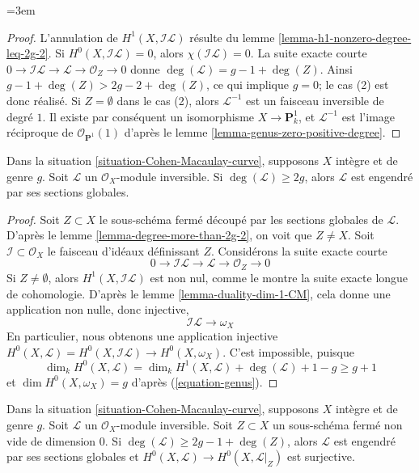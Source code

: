 \begingroup\emergencystretch=3em
\begin{proof}
L'annulation de $H^1(X, \mathcal{I}\mathcal{L})$ résulte du lemme \ref{lemma-h1-nonzero-degree-leq-2g-2}. Si $H^0(X, \mathcal{I}\mathcal{L}) = 0$, alors $\chi(\mathcal{I}\mathcal{L}) = 0$. La suite exacte courte $0 \to \mathcal{I}\mathcal{L} \to \mathcal{L} \to \mathcal{O}_Z \to 0$ donne $\deg(\mathcal{L}) = g - 1 + \deg(Z)$. Ainsi $g - 1 + \deg(Z) > 2g - 2 + \deg(Z)$, ce qui implique $g = 0$; le cas (2) est donc réalisé. Si $Z = \emptyset$ dans le cas (2), alors $\mathcal{L}^{-1}$ est un faisceau inversible de degré $1$. Il existe par conséquent un isomorphisme $X \to \mathbf{P}^1_k$, et $\mathcal{L}^{-1}$ est l'image réciproque de $\mathcal{O}_{\mathbf{P}^1}(1)$ d'après le lemme \ref{lemma-genus-zero-positive-degree}.
\end{proof}
\endgroup

\begin{lemma}
\label{lemma-degree-more-than-2g}
\begin{reference}
\cite[Lemme 3]{Jongmin}
\end{reference}
Dans la situation \ref{situation-Cohen-Macaulay-curve}, supposons $X$ intègre et de genre $g$. Soit $\mathcal{L}$ un $\mathcal{O}_X$-module inversible. Si $\deg(\mathcal{L}) \geq 2g$, alors $\mathcal{L}$ est engendré par ses sections globales.
\end{lemma}

\begin{proof}
Soit $Z \subset X$ le sous-schéma fermé découpé par les sections globales de $\mathcal{L}$. D'après le lemme \ref{lemma-degree-more-than-2g-2}, on voit que $Z \not = X$. Soit $\mathcal{I} \subset \mathcal{O}_X$ le faisceau d'idéaux définissant $Z$. Considérons la suite exacte courte $$
0 \to \mathcal{I}\mathcal{L}
\to \mathcal{L} \to \mathcal{O}_Z \to 0
$$ Si $Z \not = \emptyset$, alors $H^1(X, \mathcal{I}\mathcal{L})$ est non nul, comme le montre la suite exacte longue de cohomologie. D'après le lemme \ref{lemma-duality-dim-1-CM}, cela donne une application non nulle, donc injective, $$
\mathcal{I}\mathcal{L}
\longrightarrow
\omega_X
$$ En particulier, nous obtenons une application injective $H^0(X, \mathcal{L}) = H^0(X, \mathcal{I}\mathcal{L})
\to H^0(X, \omega_X)$. C'est impossible, puisque $$
\dim_k H^0(X, \mathcal{L}) = \dim_k H^1(X, \mathcal{L}) +
\deg(\mathcal{L}) + 1 - g \geq g + 1
$$ et $\dim H^0(X, \omega_X) = g$ d'après (\ref{equation-genus}).
\end{proof}

\begin{lemma}
\label{lemma-degree-more-than-2g-1-and-Z}
Dans la situation \ref{situation-Cohen-Macaulay-curve}, supposons $X$ intègre et de genre $g$. Soit $\mathcal{L}$ un $\mathcal{O}_X$-module inversible. Soit $Z \subset X$ un sous-schéma fermé non vide de dimension $0$. Si $\deg(\mathcal{L}) \geq 2g - 1 + \deg(Z)$, alors $\mathcal{L}$ est engendré par ses sections globales et $H^0(X, \mathcal{L}) \to H^0(X, \mathcal{L}|_Z)$ est surjective.
\end{lemma}


